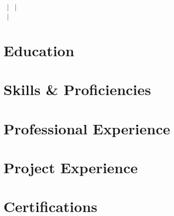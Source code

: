 \documentclass[letterpaper,10pt]{article}
\begin{document}
\begin{center}
  {\Large\bfseries \cvName}\\[2pt]
  \cvLocation\ $|$ \cvPhone\ $|$ \href{mailto:\cvEmail}{\cvEmail}\\
  \href{\cvGithubUrl}{\cvGithub}\ $|$ \href{\cvPortfolioUrl}{\cvPortfolio}
\end{center}

\section{Education}                \cvEducation
\section{Skills \& Proficiencies}  \cvSkills
\section{Professional Experience}  \cvExperience
\section{Project Experience}       \cvProjects
\section{Certifications}           \cvCerts
\end{document}
